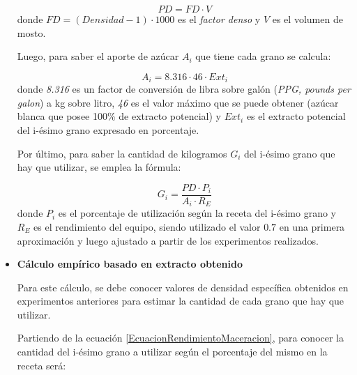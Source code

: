 \begin{itemize}
                        \begin{equation}
                            PD = FD \cdot V
                        \end{equation}
                        donde $FD = (Densidad -1)\cdot 1000 $ es el \textit{factor denso} y $V$ es el volumen de mosto.
                        
                        \par Luego, para saber el aporte de azúcar $A_i$ que tiene cada grano se calcula:
                        
                        \begin{equation}
                            A_{i} = 8.316 \cdot 46 \cdot Ext_{i}                           
                        \end{equation}
                        donde \textit{8.316} es un factor de conversión de libra sobre galón (\textit{PPG, pounds per galon}) a kg sobre litro, \textit{46} es el valor máximo que se puede obtener (azúcar blanca que posee 100\% de extracto potencial) y $Ext_i$ es el extracto potencial del i-ésimo grano expresado en porcentaje.
                        
                        \par Por último, para saber la cantidad de kilogramos $G_i$ del i-ésimo grano que hay que utilizar, se emplea la fórmula:
                        
                        \begin{equation}
                            G_{i} = \frac{PD \cdot P_{i}}{A_{i} \cdot R_E} 
                            \label{EcuacionRayDaniels}
                        \end{equation}
                        donde $P_i$ es el porcentaje de utilización según la receta del i-ésimo grano y $R_E$ es el rendimiento del equipo, siendo utilizado el valor $0.7$ en una primera aproximación y luego ajustado a partir de los experimentos realizados.
                        
                    \item \textbf{Cálculo empírico basado en extracto obtenido} 
                    \par Para este cálculo, se debe conocer valores de densidad específica obtenidos en experimentos anteriores para estimar la cantidad de cada grano que hay que utilizar.
                    
                    \par Partiendo de la ecuación \ref{EcuacionRendimientoMaceracion}, para conocer la cantidad del i-ésimo grano a utilizar según el porcentaje del mismo en la receta será:
                    

\end{itemize}
